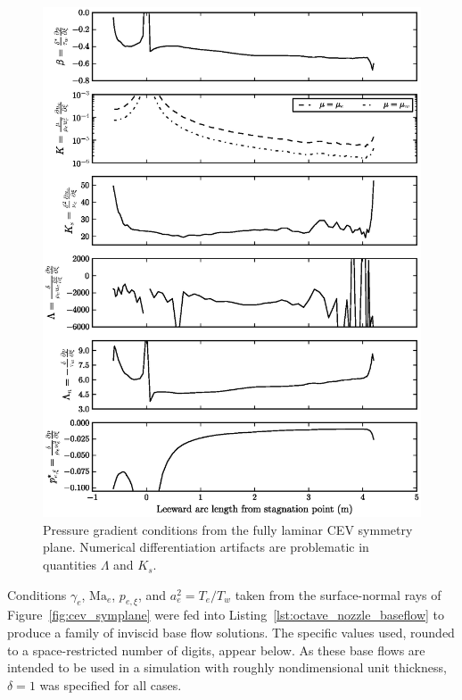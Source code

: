 \documentclass[letterpaper,11pt,nointlimits,reqno]{amsart}
\newcommand{\Mach}[1][]{\mbox{Ma}_{#1}}
\begin{document}
\begin{figure}[p]
  \centering
  \includegraphics[height=0.92\textheight]{cev_summary_fpg}
  \caption{
    \label{fig:cev_summary_fpg}
    Pressure gradient conditions from the fully laminar CEV symmetry plane.
    Numerical differentiation artifacts are problematic in quantities $\Lambda$
    and $K_s$.
  }
\end{figure}

Conditions $\gamma_e$, $\Mach[e]{}$, $p_{e,\xi}$, and $a^2_e = T_e/T_w$ taken
from the surface-normal rays of Figure~\ref{fig:cev_symplane} were fed into
Listing~\ref{lst:octave_nozzle_baseflow} to produce a family of inviscid base
flow solutions.  The specific values used, rounded to a space-restricted number
of digits, appear below.  As these base flows are intended to be used in a
simulation with roughly nondimensional unit thickness, $\delta=1$ was specified
for all cases.
\end{document}
